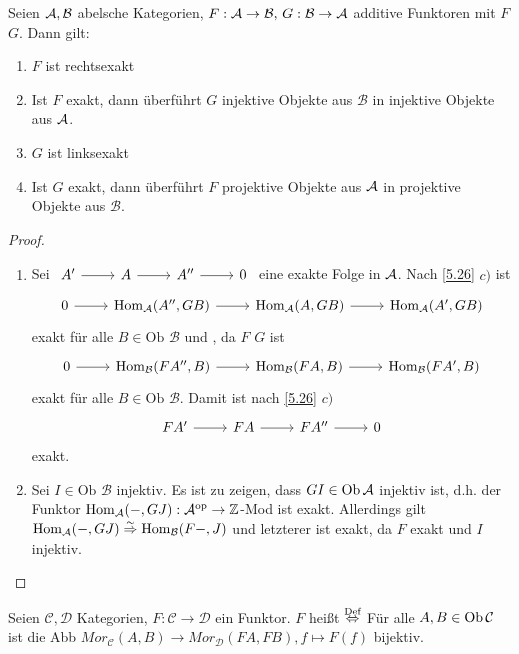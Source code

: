 \begin{sa}\label{5.33}
	Seien $\mathcal{A}, \mathcal{B}$ abelsche Kategorien, $F:\mathcal{A} \to \mathcal{B}, \, G: \mathcal{B} \to \mathcal{A}$ additive Funktoren mit $F$  $G$. Dann gilt:
	\begin{enumerate}[label= \alph*)]
		\item $F$ ist rechtsexakt
		\item Ist $F$ exakt, dann überführt $G$ injektive Objekte aus $\mathcal{B}$ in injektive Objekte aus $\mathcal{A}$.
		\item $G$ ist linksexakt
		\item Ist $G$ exakt, dann überführt $F$ projektive Objekte aus $\mathcal{A}$ in projektive Objekte aus $\mathcal{B}$.
	\end{enumerate}
\end{sa}
\begin{proof}
	\begin{enumerate}[label= \alph*)]
		\item Sei $\begin{tikzcd}
		A' \arrow{r} & A \arrow{r} & A'' \arrow{r} & 0
		\end{tikzcd}$ eine exakte Folge in $\mathcal{A}$. Nach \ref{5.26} $c)$ ist 
			$$\begin{tikzcd}
		0 \arrow{r}& \Hom_\A(A'', GB) \arrow{r} & \Hom_\A(A,GB) \arrow{r} & \Hom_\A(A',GB)
		\end{tikzcd}$$
		exakt für alle $B\in \text{Ob }\mathcal{B}$ und , da $F$   $G$ ist
		$$\begin{tikzcd}
		0 \arrow{r}& \Hom_\mathcal{B}(FA'', B) \arrow{r} & \Hom_\mathcal{B}(FA,B) \arrow{r} & \Hom_\mathcal{B}(FA',B)
		\end{tikzcd}$$
		exakt für alle $B\in \text{Ob }\mathcal{B}$. Damit ist nach \ref{5.26} $c)$
		$$\begin{tikzcd}
		FA' \arrow{r} & FA \arrow{r} & FA'' \arrow{r} & 0
		\end{tikzcd}$$
		exakt.
		\item Sei $I\in \text{Ob } \mathcal{B}$ injektiv. Es ist zu zeigen, dass $GI\in \text{Ob}\,\mathcal{A}$ injektiv ist, d.h. der Funktor $\operatorname{Hom}_{\mathcal{A}}(-, GJ): \mathcal{A}^\text{op}\to \mathbb{Z}$-Mod ist exakt. Allerdings gilt $\operatorname{Hom}_{\mathcal{A}}(-,GJ ) \overset{\sim}{\Rightarrow} \operatorname{Hom}_\mathcal{B}(F-,J)$ und letzterer ist exakt, da $F$ exakt und $I$ injektiv.
		
	\end{enumerate}
\end{proof}
\begin{df}\label{5.34}
	Seien $\mathcal{C}, \mathcal{D} $ Kategorien, $F: \mathcal{C} \to \mathcal{D} $ ein Funktor. $F$ heißt  $\overset{\text{Def}}{\Leftrightarrow} $ Für alle $A,B \in \text{Ob}\,\mathcal{C} $ ist die Abb $Mor_{\mathcal{C}}(A,B) \to Mor_{\mathcal{D}}(FA,FB), f \mapsto F(f) $ bijektiv.
\end{df}
